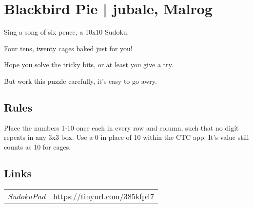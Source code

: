 \section[Blackbird Pie | jubale, Malrog {[\emph{Sudoku}]}]{Blackbird Pie | {\normalfont jubale, Malrog}}
\label{sec:26-blackbird-pie-jubale-malrog}
Sing a song of six pence, a 10x10 Sudoku.

Four tens, twenty cages baked just for you!

Hope you solve the tricky bits, or at least you give a try.

But work this puzzle carefully, it’s easy to go awry.
\subsection*{Rules}
\begin{markdown}
Place the numbers 1-10 once each in every row and column, such that no digit repeats in any 3x3 box.  Use a 0 in place of 10 within the CTC app.  It’s value still counts as 10 for cages. 
\end{markdown}
\subsection*{Links}
\begin{tabularx}{\textwidth}{l X}
\emph{SudokuPad} & \url{https://tinyurl.com/385kfp47} \\
\end{tabularx}
\pagebreak
